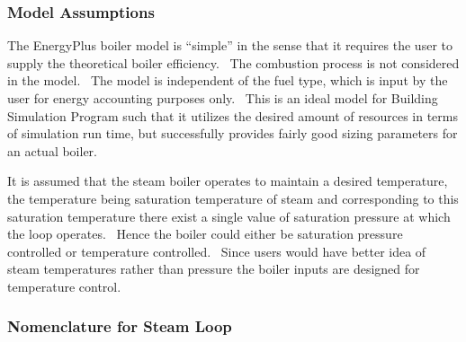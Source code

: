 \subsubsection{Model Assumptions}\label{model-assumptions}

The EnergyPlus boiler model is ``simple'' in the sense that it requires the user to supply the theoretical boiler efficiency.~ The combustion process is not considered in the model.~ The model is independent of the fuel type, which is input by the user for energy accounting purposes only.~ This is an ideal model for Building Simulation Program such that it utilizes the desired amount of resources in terms of simulation run time, but successfully provides fairly good sizing parameters for an actual boiler.

It is assumed that the steam boiler operates to maintain a desired temperature, the temperature being saturation temperature of steam and corresponding to this saturation temperature there exist a single value of saturation pressure at which the loop operates.~ Hence the boiler could either be saturation pressure controlled or temperature controlled.~ Since users would have better idea of steam temperatures rather than pressure the boiler inputs are designed for temperature control.

\subsubsection{Nomenclature for Steam Loop}\label{nomenclature-for-steam-loop}

